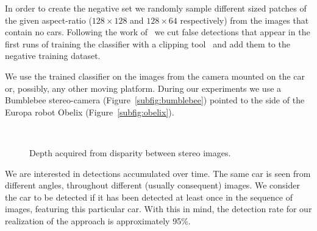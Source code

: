 In order to create the negative set we randomly sample different sized patches
of the given aspect-ratio ($128 \times 128$ and $128 \times 64$ respectively)
from the images that contain no cars. Following the work of~\citet{dalal2005}
we cut false detections that appear in the first runs of training the
classifier with a clipping tool~\cite{imageclipper} and add them to the
negative training dataset.

We use the trained classifier on the images from the camera mounted on the car
or, possibly, any other moving platform. During our experiments we use a
Bumblebee stereo-camera (Figure~\ref{subfig:bumblebee}) pointed to the side of
the Europa robot Obelix (Figure~\ref{subfig:obelix}).

\begin{figure}[t]%
\centering
{}\hspace{2mm}
\hspace{2mm}
\\
\caption{Depth acquired from disparity between stereo images.}
\label{fig:depth_from_disparity}
\end{figure}

We are interested in detections accumulated over time. The same car is seen
from different angles, throughout different (usually consequent) images. We
consider the car to be detected if it has been detected at least once in the
sequence of images, featuring this particular car. With this in mind, the
detection rate for our realization of the approach is approximately 95\%.

